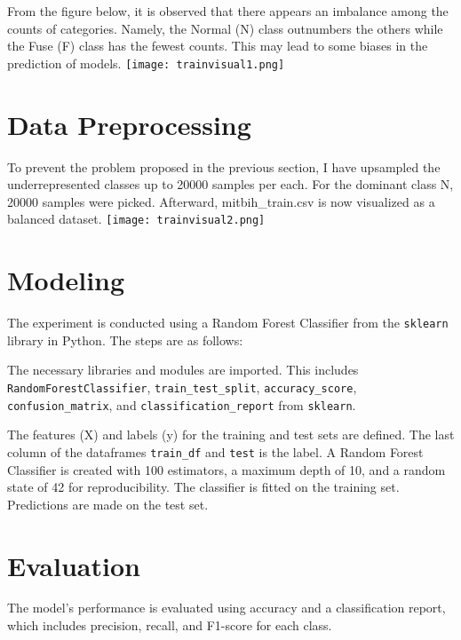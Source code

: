 \documentclass{article}
\begin{document}
\begin{multicols}{2}
From the figure below, it is observed that there appears an imbalance among the counts of categories. Namely, the Normal (N) class outnumbers the others while the Fuse (F) class has the fewest counts. This may lead to some biases in the prediction of models.
\texttt{[image: trainvisual1.png]}
    \label{fig:train}
\section{Data Preprocessing}
To prevent the problem proposed in the previous section, I have upsampled the underrepresented classes up to 20000 samples per each. For the dominant class N, 20000 samples were picked. Afterward, mitbih\_train.csv is now visualized as a balanced dataset.
\texttt{[image: trainvisual2.png]}
    \label{fig:train resample}
\section{Modeling}
The experiment is conducted using a Random Forest Classifier from the \texttt{sklearn} library in Python. The steps are as follows:

The necessary libraries and modules are imported. This includes \texttt{RandomForestClassifier}, \texttt{train\_test\_split}, \texttt{accuracy\_score}, \texttt{confusion\_matrix}, and \texttt{classification\_report} from \texttt{sklearn}.

The features (X) and labels (y) for the training and test sets are defined. The last column of the dataframes \texttt{train\_df} and \texttt{test} is the label. A Random Forest Classifier is created with 100 estimators, a maximum depth of 10, and a random state of 42 for reproducibility. The classifier is fitted on the training set. Predictions are made on the test set. 

\section{Evaluation}
The model's performance is evaluated using accuracy and a classification report, which includes precision, recall, and F1-score for each class.


\end{multicols}
\end{document}
